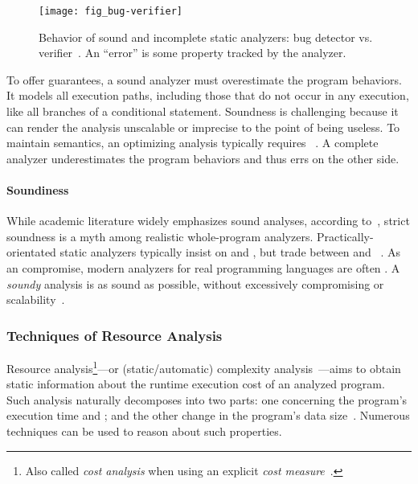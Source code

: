 \begin{figure}[t]
\centering
\texttt{[image: fig\_bug-verifier]}
\caption[Sound and incomplete bug detector vs. verifier]{
Behavior of sound and incomplete static analyzers: bug detector vs.
verifier~\cite{moller2024}. An \enquote{error} is some property tracked
by the analyzer.}
\label{fig:bug-verify}
\end{figure}

To offer guarantees, a sound analyzer must overestimate the program behaviors.
It models all execution paths, including those that do not occur in any
execution, like all branches of a conditional statement.
Soundness is challenging because it can render the analysis
unscalable or imprecise to the point of being useless. To maintain semantics, an
optimizing analysis typically requires ~\cite[p. 5]{moller2023}.
A complete analyzer underestimates the program behaviors and
thus errs on the other side.

\paragraph*{Soundiness}
While academic literature widely emphasizes sound analyses, according
to~\textcite{livshits2015}, strict soundness is a myth among realistic
whole-program analyzers. Practically-orientated static analyzers typically
insist on  and , but trade between
 and ~\cite{moller2023,steffen2020}. As an
compromise, modern analyzers for real programming languages are often
. A \emph{soundy} analysis is as sound as possible, without
excessively compromising  or scalability~\cite{livshits2015}.

\subsubsection{Techniques of Resource Analysis}
\label{resource-analysis}

Resource analysis\footnote{ Also called \emph{cost
analysis} when using an explicit \emph{cost measure}~\cite{albert2008}. }---or
(static/automatic) {complexity analysis}~\cite{rosendahl1989,leivant2013}---aims
to obtain static information about the runtime {execution cost} of an analyzed
program. Such analysis naturally decomposes into two parts: one concerning the
program's execution time and ; and the other change in the
program's data size~\cite{jones2009}. Numerous techniques can be used to reason
about such properties.

